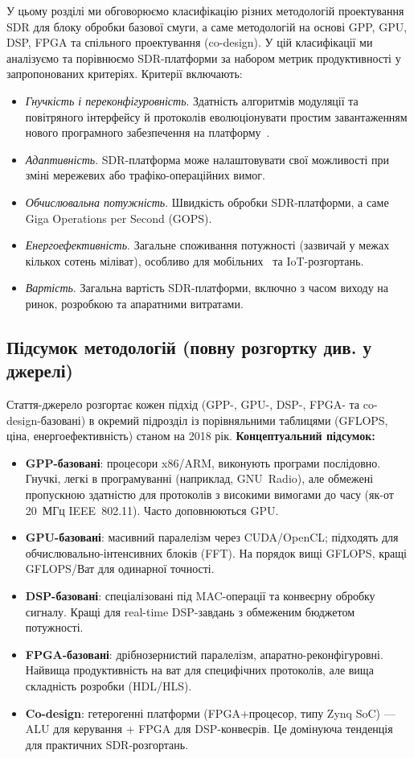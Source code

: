 \documentclass[journal]{IEEEtran}
\begin{document}
У цьому розділі ми обговорюємо класифікацію різних методологій проектування SDR для блоку обробки базової смуги, а саме методологій на основі GPP, GPU, DSP, FPGA та спільного проектування (co-design).
У цій класифікації ми аналізуємо та порівнюємо SDR-платформи за набором метрик продуктивності у запропонованих критеріях.
Критерії включають:
\begin{itemize}
\item \textit{Гнучкість і переконфігуровність}. Здатність алгоритмів модуляції та повітряного інтерфейсу й протоколів еволюціонувати простим завантаженням нового програмного забезпечення на платформу~\cite{Angeletti2014}.
\item \textit{Адаптивність}. SDR-платформа може налаштовувати свої можливості при зміні мережевих або трафіко-операційних вимог.
\item \textit{Обчислювальна потужність}. Швидкість обробки SDR-платформи, а саме Giga Operations per Second (GOPS).
\item \textit{Енергоефективність}. Загальне споживання потужності (зазвичай у межах кількох сотень міліват), особливо для мобільних~\cite{Dezfouli2017} та IoT-розгортань.
\item \textit{Вартість}. Загальна вартість SDR-платформи, включно з часом виходу на ринок, розробкою та апаратними витратами.
\end{itemize}

\subsection{Підсумок методологій (повну розгортку див. у джерелі)}

Стаття-джерело розгортає кожен підхід (GPP-, GPU-, DSP-, FPGA- та co-design-базовані) в окремий підрозділ із порівняльними таблицями (GFLOPS, ціна, енергоефективність) станом на 2018 рік.
\textbf{Концептуальний підсумок:}
\begin{itemize}
\item \textbf{GPP-базовані}: процесори x86/ARM, виконують програми послідовно. Гнучкі, легкі в програмуванні (наприклад, GNU~Radio), але обмежені пропускною здатністю для протоколів з високими вимогами до часу (як-от 20~МГц IEEE~802.11). Часто доповнюються GPU.
\item \textbf{GPU-базовані}: масивний паралелізм через CUDA/OpenCL; підходять для обчислювально-інтенсивних блоків (FFT). На порядок вищі GFLOPS, кращі GFLOPS/Ват для одинарної точності.
\item \textbf{DSP-базовані}: спеціалізовані під MAC-операції та конвеєрну обробку сигналу. Кращі для real-time DSP-завдань з обмеженим бюджетом потужності.
\item \textbf{FPGA-базовані}: дрібнозернистий паралелізм, апаратно-реконфігуровні. Найвища продуктивність на ват для специфічних протоколів, але вища складність розробки (HDL/HLS).
\item \textbf{Co-design}: гетерогенні платформи (FPGA+процесор, типу Zynq SoC) — ALU для керування + FPGA для DSP-конвеєрів. Це домінуюча тенденція для практичних SDR-розгортань.
\end{itemize}
\end{document}
